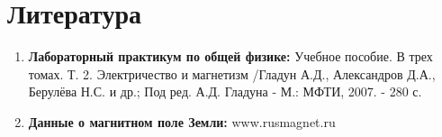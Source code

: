 \documentclass[a4paper, 12pt]{article}%
\begin{document}
\section{Литература}

\begin{enumerate}
\item \textbf{Лабораторный практикум по общей физике:} Учебное пособие. В трех томах. Т. 2. Электричество и магнетизм /Гладун А.Д., Александров Д.А., Берулёва Н.С. и др.; Под ред. А.Д. Гладуна - М.: МФТИ, 2007. - 280 с.

\item \textbf{Данные о магнитном поле Земли:} www.rusmagnet.ru 
\end{enumerate}		
		
\end{document}
